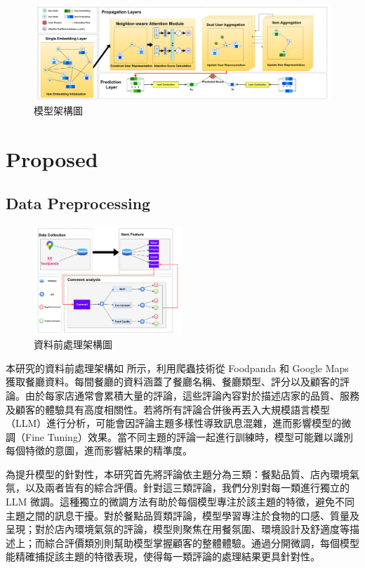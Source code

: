\color{blue}

\begin{figure}[htbp]
    \centering
    \includegraphics[width=\textwidth]{img/Model.pdf} %
    \caption{模型架構圖}
    \label{fig:cross-column}
\end{figure}

\section{Proposed}
\subsection{Data Preprocessing}
    \begin{figure}[tbh]
        \centering
        \includegraphics[width=0.5\textwidth]{img/preprocess.pdf}
        \caption{資料前處理架構圖}
        \label{fig-preprocess}
    \end{figure}
    本研究的資料前處理架構如  所示，利用爬蟲技術從 Foodpanda 和 Google Maps 獲取餐廳資料。每間餐廳的資料涵蓋了餐廳名稱、餐廳類型、評分以及顧客的評論。由於每家店通常會累積大量的評論，這些評論內容對於描述店家的品質、服務及顧客的體驗具有高度相關性。若將所有評論合併後再丟入大規模語言模型（LLM）進行分析，可能會因評論主題多樣性導致訊息混雜，進而影響模型的微調（Fine Tuning）效果。當不同主題的評論一起進行訓練時，模型可能難以識別每個特徵的意圖，進而影響結果的精準度。

    為提升模型的針對性，本研究首先將評論依主題分為三類：餐點品質、店內環境氣氛，以及兩者皆有的綜合評價。針對這三類評論，我們分別對每一類進行獨立的 LLM 微調。這種獨立的微調方法有助於每個模型專注於該主題的特徵，避免不同主題之間的訊息干擾。對於餐點品質類評論，模型學習專注於食物的口感、質量及呈現；對於店內環境氣氛的評論，模型則聚焦在用餐氛圍、環境設計及舒適度等描述上；而綜合評價類別則幫助模型掌握顧客的整體體驗。通過分開微調，每個模型能精確捕捉該主題的特徵表現，使得每一類評論的處理結果更具針對性。

